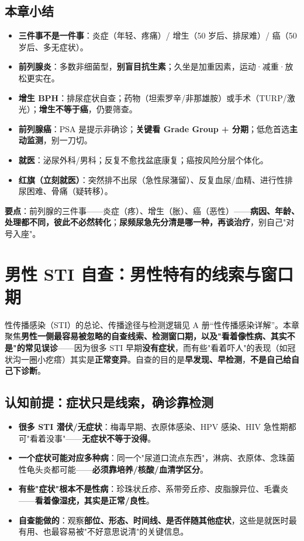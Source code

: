 \documentclass[12pt,UTF8,openany]{ctexbook}
\begin{document}
\section{本章小结}
\begin{itemize}[leftmargin=2em,itemsep=0.2em]
  \item \textbf{三件事不是一件事}：炎症（年轻、疼痛）/ 增生（50 岁后、排尿难）/ 癌（50 岁后、多无症状）。
  \item \textbf{前列腺炎}：多数非细菌型，\textbf{别盲目抗生素}；久坐是加重因素，运动·减重·放松更实在。
  \item \textbf{增生 BPH}：排尿症状自查；药物（坦索罗辛/非那雄胺）或手术（TURP/激光）；\textbf{增生不等于癌}，仍要筛查。
  \item \textbf{前列腺癌}：PSA 是提示非确诊；\textbf{关键看 Grade Group + 分期}；低危首选\textbf{主动监测}，别一刀切。
  \item \textbf{就医}：泌尿外科/男科；反复不愈找盆底康复；癌按风险分层个体化。
  \item \textbf{红旗（立刻就医）}：突然排不出尿（急性尿潴留）、反复血尿/血精、进行性排尿困难、骨痛（疑转移）。
\end{itemize}

\vspace{1em}
\noindent\textbf{要点}：前列腺的三件事——炎症（疼）、增生（胀）、癌（恶性）——\textbf{病因、年龄、处理都不同，彼此不必然转化}；\textbf{尿频尿急先分清是哪一种，再谈治疗}，别自己"对号入座"。

\chapter{男性 STI 自查：男性特有的线索与窗口期}
\label{chap:male-sti}

性传播感染（STI）的总论、传播途径与检测逻辑见 A 册“性传播感染详解”。本章聚焦\textbf{男性一侧最容易被忽略的自查线索、检测窗口期，以及"看着像性病、其实不是"的常见误诊}——因为很多 STI 早期\textbf{没有症状}，而有些"看着吓人"的表现（如冠状沟一圈小疙瘩）其实是\textbf{正常变异}。自查的目的是\textbf{早发现、早检测}，\textbf{不是自己给自己下诊断}。

\section{认知前提：症状只是线索，确诊靠检测}

\begin{itemize}[leftmargin=2em,itemsep=0.3em]
  \item \textbf{很多 STI 潜伏/无症状}：梅毒早期、衣原体感染、HPV 感染、HIV 急性期都可"看着没事"——\textbf{无症状不等于没得}。
  \item \textbf{一个症状可能对应多种病}：同一个"尿道口流点东西"，淋病、衣原体、念珠菌性龟头炎都可能——\textbf{必须靠培养/核酸/血清学区分}。
  \item \textbf{有些"症状"根本不是性病}：珍珠状丘疹、系带旁丘疹、皮脂腺异位、毛囊炎——\textbf{看着像湿疣，其实是正常/良性}。
  \item \textbf{自查能做的}：观察\textbf{部位、形态、时间线、是否伴随其他症状}，这些是就医时最有用、也最容易被"不好意思说清"的关键信息。
\end{itemize}
\end{document}
